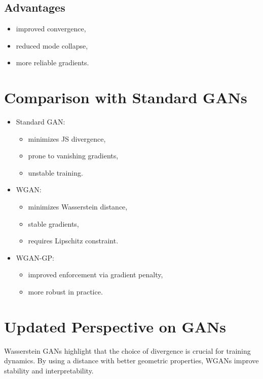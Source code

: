\subsection{Advantages}

\begin{itemize}
    \item improved convergence,
    \item reduced mode collapse,
    \item more reliable gradients.
\end{itemize}

\section{Comparison with Standard GANs}

\begin{itemize}
    \item Standard GAN:
    \begin{itemize}
        \item minimizes JS divergence,
        \item prone to vanishing gradients,
        \item unstable training.
    \end{itemize}
    \item WGAN:
    \begin{itemize}
        \item minimizes Wasserstein distance,
        \item stable gradients,
        \item requires Lipschitz constraint.
    \end{itemize}
    \item WGAN-GP:
    \begin{itemize}
        \item improved enforcement via gradient penalty,
        \item more robust in practice.
    \end{itemize}
\end{itemize}

\section{Updated Perspective on GANs}

Wasserstein GANs highlight that the choice of divergence is crucial for training dynamics. By using a distance with better geometric properties, WGANs improve stability and interpretability.

